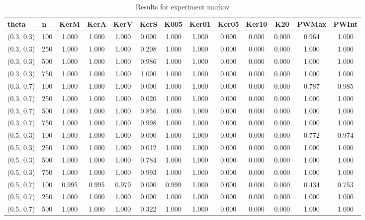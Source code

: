     \begin{table}[ht]
    \centering
    
    \caption{Results for experiment markov}
    \tiny{
\begin{tabular}{ll|ccccccccccc}
\hline
theta & n & KerM & KerA & KerV & KerS & K005 & Ker01 & Ker05 & Ker10 & K20 & PWMax & PWInt \\
\hline
(0.3, 0.3) & 100 & 1.000 & 1.000 & 1.000 & 0.000 & 1.000 & 1.000 & 0.000 & 0.000 & 0.000 & 0.964 & 1.000 \\
(0.3, 0.3) & 250 & 1.000 & 1.000 & 1.000 & 0.208 & 1.000 & 1.000 & 0.000 & 0.000 & 0.000 & 1.000 & 1.000 \\
(0.3, 0.3) & 500 & 1.000 & 1.000 & 1.000 & 0.986 & 1.000 & 1.000 & 0.000 & 0.000 & 0.000 & 1.000 & 1.000 \\
(0.3, 0.3) & 750 & 1.000 & 1.000 & 1.000 & 1.000 & 1.000 & 1.000 & 0.000 & 0.000 & 0.000 & 1.000 & 1.000 \\
(0.3, 0.7) & 100 & 1.000 & 1.000 & 1.000 & 0.000 & 1.000 & 1.000 & 0.000 & 0.000 & 0.000 & 0.787 & 0.985 \\
(0.3, 0.7) & 250 & 1.000 & 1.000 & 1.000 & 0.020 & 1.000 & 1.000 & 0.000 & 0.000 & 0.000 & 1.000 & 1.000 \\
(0.3, 0.7) & 500 & 1.000 & 1.000 & 1.000 & 0.856 & 1.000 & 1.000 & 0.000 & 0.000 & 0.000 & 1.000 & 1.000 \\
(0.3, 0.7) & 750 & 1.000 & 1.000 & 1.000 & 0.998 & 1.000 & 1.000 & 0.000 & 0.000 & 0.000 & 1.000 & 1.000 \\
(0.5, 0.3) & 100 & 1.000 & 1.000 & 1.000 & 0.000 & 1.000 & 1.000 & 0.000 & 0.000 & 0.000 & 0.772 & 0.974 \\
(0.5, 0.3) & 250 & 1.000 & 1.000 & 1.000 & 0.012 & 1.000 & 1.000 & 0.000 & 0.000 & 0.000 & 1.000 & 1.000 \\
(0.5, 0.3) & 500 & 1.000 & 1.000 & 1.000 & 0.784 & 1.000 & 1.000 & 0.000 & 0.000 & 0.000 & 1.000 & 1.000 \\
(0.5, 0.3) & 750 & 1.000 & 1.000 & 1.000 & 0.993 & 1.000 & 1.000 & 0.000 & 0.000 & 0.000 & 1.000 & 1.000 \\
(0.5, 0.7) & 100 & 0.995 & 0.995 & 0.979 & 0.000 & 0.999 & 1.000 & 0.000 & 0.000 & 0.000 & 0.434 & 0.753 \\
(0.5, 0.7) & 250 & 1.000 & 1.000 & 1.000 & 0.000 & 1.000 & 1.000 & 0.000 & 0.000 & 0.000 & 1.000 & 1.000 \\
(0.5, 0.7) & 500 & 1.000 & 1.000 & 1.000 & 0.322 & 1.000 & 1.000 & 0.000 & 0.000 & 0.000 & 1.000 & 1.000 \\

\end{tabular}}
\end{table}
